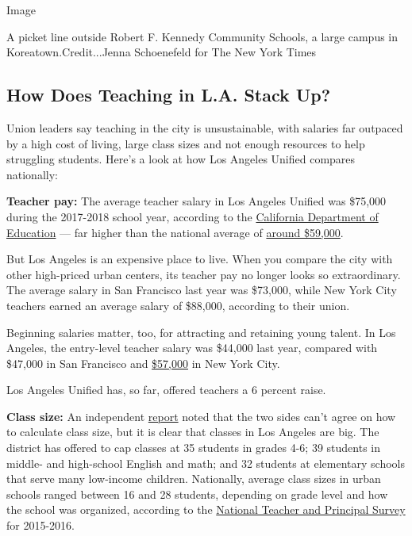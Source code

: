Image

A picket line outside Robert F. Kennedy Community Schools, a large
campus in Koreatown.Credit...Jenna Schoenefeld for The New York Times

\hypertarget{how-does-teaching-in-la-stack-up}{%
\subsection{How Does Teaching in L.A. Stack
Up?}\label{how-does-teaching-in-la-stack-up}}

Union leaders say teaching in the city is unsustainable, with salaries
far outpaced by a high cost of living, large class sizes and not enough
resources to help struggling students. Here's a look at how Los Angeles
Unified compares nationally:

\textbf{Teacher pay:} The average teacher salary in Los Angeles Unified
was \$75,000 during the 2017-2018 school year, according to the
\href{https://www.cde.ca.gov/ds/fd/cs/documents/j90summary1718.pdf}{California
Department of Education} --- far higher than the national average of
\href{https://nces.ed.gov/programs/digest/d17/tables/dt17_211.60.asp?current=yes}{around
\$59,000}.

But Los Angeles is an expensive place to live. When you compare the city
with other high-priced urban centers, its teacher pay no longer looks so
extraordinary. The average salary in San Francisco last year was
\$73,000, while New York City teachers earned an average salary of
\$88,000, according to their union.

Beginning salaries matter, too, for attracting and retaining young
talent. In Los Angeles, the entry-level teacher salary was \$44,000 last
year, compared with \$47,000 in San Francisco and
\href{https://www.schools.nyc.gov/careers/working-at-the-doe/benefits-and-pay}{\$57,000}
in New York City.

Los Angeles Unified has, so far, offered teachers a 6 percent raise.

\textbf{Class size:} An independent
\href{https://www.lataco.com/wp-content/uploads/utla-lausd-fact-finding-report.pdf}{report}
noted that the two sides can't agree on how to calculate class size, but
it is clear that classes in Los Angeles are big. The district has
offered to cap classes at 35 students in grades 4-6; 39 students in
middle- and high-school English and math; and 32 students at elementary
schools that serve many low-income children. Nationally, average class
sizes in urban schools ranged between 16 and 28 students, depending on
grade level and how the school was organized, according to the
\href{https://nces.ed.gov/surveys/ntps/tables/ntps_7t_051617.asp}{National
Teacher and Principal Survey} for 2015-2016.

